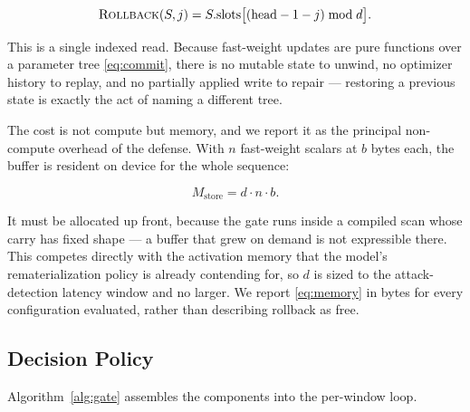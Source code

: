 \documentclass[journal]{IEEEtran}
\begin{document}
\begin{equation}
\textsc{Rollback}(S, j) = S.\mathrm{slots}\big[(\mathrm{head} - 1 - j) \bmod d\big].
\label{eq:rollback}
\end{equation}

This is a single indexed read. Because fast-weight updates are pure functions over a
parameter tree \eqref{eq:commit}, there is no mutable state to unwind, no optimizer
history to replay, and no partially applied write to repair --- restoring a previous
state is exactly the act of naming a different tree.

The cost is not compute but memory, and we report it as the principal non-compute
overhead of the defense. With $n$ fast-weight scalars at $b$ bytes each, the buffer
is resident on device for the whole sequence:

\begin{equation}
M_{\mathrm{store}} = d \cdot n \cdot b .
\label{eq:memory}
\end{equation}

It must be allocated up front, because the gate runs inside a compiled scan whose
carry has fixed shape --- a buffer that grew on demand is not expressible there. This
competes directly with the activation memory that the model's rematerialization
policy is already contending for, so $d$ is sized to the attack-detection latency
window and no larger. We report \eqref{eq:memory} in bytes for every configuration
evaluated, rather than describing rollback as free.

\subsection{Decision Policy}
\label{sec:policy}

Algorithm~\ref{alg:gate} assembles the components into the per-window loop.
\end{document}
